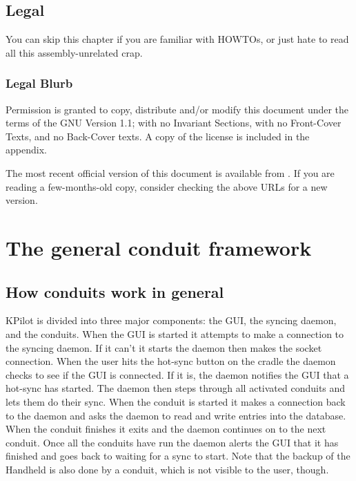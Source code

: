 \documentclass[10pt,a4paper]{article}
\begin{document}
\subsection{Legal}
You can skip this chapter if you are familiar with HOWTOs,
or just hate to read all this assembly-unrelated crap.

\subsubsection{Legal Blurb}

Permission is granted to copy, distribute and/or modify this document
under the terms of the GNU   Version 1.1;
with no Invariant Sections, with no Front-Cover Texts, and no Back-Cover texts.
A copy of the license is included in the  appendix.


The most recent official version of this document is available from
.
If you are reading a few-months-old copy,
consider checking the above URLs for a new version.



\section{The general conduit framework}\label{FactorySection}

\subsection{How conduits work in general}
    KPilot is divided into three major components: the GUI, the
syncing daemon, and the conduits.  When the GUI is started it attempts
to make a connection to the syncing daemon.  If it can't it starts the
daemon then makes the socket connection.  When the user hits the
hot-sync button on the cradle the daemon checks to see if the GUI is
connected.  If it is, the daemon notifies the GUI that a hot-sync has
started.  The daemon then steps through all activated conduits and lets them
do their sync. When the conduit is started it
makes a connection back to the daemon and asks the daemon to read and
write entries into the database.  When the conduit finishes it exits
and the daemon continues on to the next conduit.  Once all the
conduits have run the daemon alerts the GUI that it has
finished and goes back to waiting for a sync to start. Note that the backup 
of the Handheld is also done by a conduit, which is not visible to the user, though.
\end{document}
